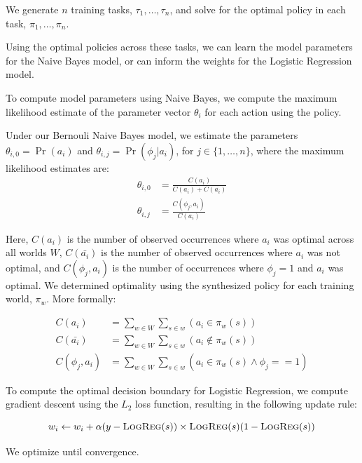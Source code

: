 \documentclass[11pt]{article}
\begin{document}
We generate $n$ training tasks, $\tau_1, \ldots, \tau_n$, and solve for the optimal policy in each task, $\pi_1, \ldots, \pi_n$.

Using the optimal policies across these tasks, we can learn the model parameters for the Naive Bayes model, or can inform the weights for the Logistic Regression model.

To compute model parameters using Naive Bayes, we compute
the maximum likelihood estimate of the parameter vector $\theta_i$ for
each action using the policy.

Under our Bernouli Naive Bayes model, we estimate the parameters
$\theta_{i,0} = \Pr(a_i)$ and $\theta_{i,j} = \Pr(\phi_j | a_i)$, for $j \in \{1, \ldots, n \}$, where the maximum likelihood estimates are:
\begin{align}
\theta_{i,0} &= \frac{C(a_i)}{C(a_i) + C(\bar{a_i})} \\
\theta_{i,j} &= \frac{C(\phi_j, a_i)}{C(a_i)}
\end{align}

Here, $C(a_i)$ is the number of observed occurrences where $a_i$ was optimal across all worlds $W$,
$C(\bar{a_i})$ is the number of observed occurrences where $a_i$ was not optimal,
and $C(\phi_j, a_i)$ is the number of occurrences where $\phi_j=1$ and $a_i$ was optimal.
We determined optimality using the synthesized policy for each training world, $\pi_w$. More formally:

\begin{align}
C(a_i) &= \sum_{w \in W} \sum_{s \in w} (a_i \in \pi_w(s)) \\
C(\bar{a_i}) &= \sum_{w \in W} \sum_{s \in w} (a_i \not \in \pi_w(s) ) \\
C(\phi_j, a_i) &= \sum_{w \in W} \sum_{s \in w} (a_i  \in \pi_w(s) \wedge \phi_j == 1)
\end{align}

To compute the optimal decision boundary for Logistic Regression, we compute gradient descent using the $L_2$ loss function, resulting in the following update rule:

\begin{equation}
w_i \leftarrow w_i + \alpha(y - \textsc{LogReg}(s)) \times \textsc{LogReg}(s)(1 - \textsc{LogReg}(s))
\end{equation}

We optimize until convergence.
\end{document}
